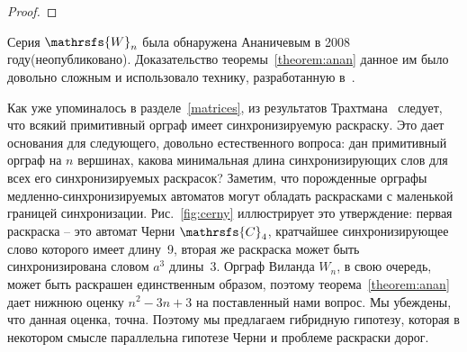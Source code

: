 \documentclass[11pt]{article}
\begin{document}
\begin{proof}
\end{proof}

Серия $\mathrsfs{W}_n$ была обнаружена Ананичевым в 2008 году(неопубликовано). 
Доказательство теоремы~\ref{theorem:anan} данное им было довольно сложным и 
использовало технику, разработанную в~\cite{AVZ}.



Как уже упоминалось в разделе~\ref{matrices}, из результатов Трахтмана~\cite{Tr09} следует, что
всякий примитивный орграф имеет синхронизируемую раскраску.
Это дает основания для следующего, довольно естественного вопроса:
дан примитивный орграф на $n$ вершинах, какова минимальная длина синхронизирующих
слов для всех его синхронизируемых раскрасок?
Заметим, что порожденные орграфы медленно-синхронизируемых автоматов могут
обладать раскрасками с маленькой границей синхронизации. Рис.~\ref{fig:cerny}
иллюстрирует это утверждение: первая раскраска -- это автомат Черни $\mathrsfs{C}_4$,
кратчайшее синхронизирующее слово которого имеет длину~9, вторая же раскраска может быть
синхронизирована словом $a^3$ длины~3.
Орграф Виланда $W_n$, в свою очередь, может быть раскрашен единственным образом,
поэтому теорема~\ref{theorem:anan} дает нижнюю оценку $n^2-3n+3$ на поставленный нами вопрос.
Мы убеждены, что данная оценка, точна. Поэтому мы предлагаем гибридную гипотезу, которая в некотором
смысле параллельна гипотезе Черни и проблеме раскраски дорог.
\end{document}
